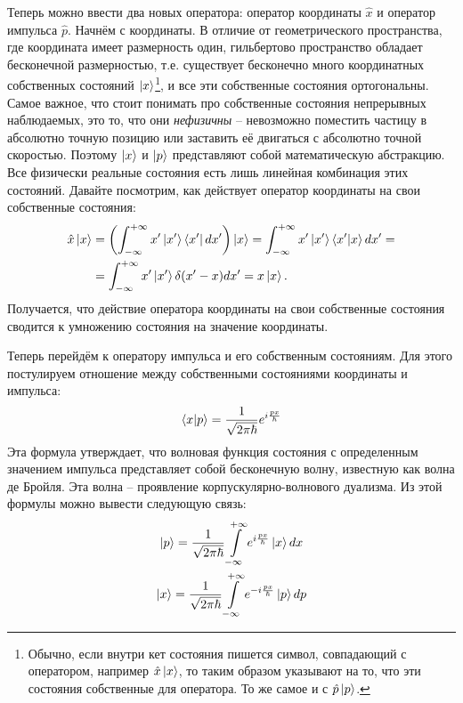 Теперь можно ввести два новых оператора: оператор координаты $\hat{x}$ и оператор импульса $\hat{p}$. Начнём с координаты. В отличие от геометрического пространства, где координата имеет размерность один, гильбертово пространство обладает бесконечной размерностью, т.е. существует бесконечно много координатных собственных состояний $\ket{x}$\footnote[1]{Обычно, если внутри кет состояния пишется символ, совпадающий с оператором, например $\hat{x}\ket{x}$, то таким образом указывают на то, что эти состояния собственные для оператора. То же самое и с $\hat{p}\ket{p}$.}, и все эти собственные состояния ортогональны. Самое важное, что стоит понимать про собственные состояния непрерывных наблюдаемых, это то, что они \textit{нефизичны} -- невозможно поместить частицу в абсолютно точную позицию или заставить её двигаться с абсолютно точной скоростью. Поэтому $\ket{x}$ и $\ket{p}$ представляют собой математическую абстракцию. Все физически реальные состояния есть лишь линейная комбинация этих состояний. Давайте посмотрим, как действует оператор координаты на свои собственные состояния:
\begin{align*}
    \hat{x} \ket{x} &= \left( \int_{-\infty}^{+\infty} x' \ket{x'} \bra{x'}dx' \right) \ket{x} = \int_{-\infty}^{+\infty} x' \ket{x'} \bra{x'} \ket{x} dx' = \\
    &= \int_{-\infty}^{+\infty} x' \ket{x'} \delta(x'-x) dx' = x \ket{x}.
\end{align*}
Получается, что действие оператора координаты на свои собственные состояния сводится к умножению состояния на значение координаты. 

Теперь перейдём к оператору импульса и его собственным состояниям. Для этого постулируем отношение между собственными состояниями координаты и импульса:
\[
\bra{x} \ket{p} = \frac{1}{\sqrt{2 \pi \hbar}}e^{i \frac{px}{\hbar}}
\]
Эта формула утверждает, что волновая функция состояния с определенным значением импульса представляет собой бесконечную волну, известную как волна де Бройля. Эта волна -- проявление корпускулярно-волнового дуализма. Из этой формулы можно вывести следующую связь:
\begin{gather*}
    \ket{p} = \frac{1}{\sqrt{2 \pi \hbar}}\int\limits_{-\infty}^{+\infty} e^{i \frac{px}{\hbar}} \ket{x} dx \\
    \ket{x} = \frac{1}{\sqrt{2\pi\hbar}} \int\limits_{-\infty}^{+\infty} e^{-i \frac{px}{\hbar}} \ket{p} dp
\end{gather*}

